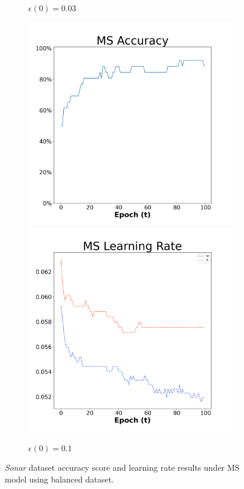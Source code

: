 \begin{figure}[H]
\begin{subfigure}{0.3\textwidth}
  \caption{$\epsilon(0)=0.03$}
\end{subfigure}\hfil %
\begin{subfigure}{0.3\textwidth}
  \includegraphics[width=\linewidth]{images/exper1/Sonar/MS_0.1_acc.png}
  \includegraphics[width=\linewidth]{images/exper1/Sonar/MS_0.1_lr.png}
  \caption{$\epsilon(0)=0.1$}
\end{subfigure}

\caption{\textit{Sonar} dataset accuracy score and learning rate results under MS model using balanced dataset.}
\end{figure}

